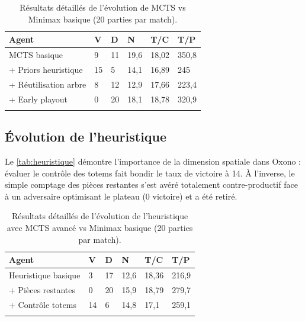 \documentclass[a4paper,11pt]{article}
\begin{document}
\begin{table}[H]
	\centering
	\caption{Résultats détaillés de l'évolution de MCTS vs Minimax basique (20 parties par match).}
	\label{tab:mcts}
	\begin{tabularx}{\textwidth}{lXXXXX}
		\toprule
		\textbf{Agent}        & \textbf{V} & \textbf{D} & \textbf{N} & \textbf{T/C} & \textbf{T/P} \\
		\midrule
		MCTS basique          & 9          & 11         & 19,6       & 18,02        & 350,8        \\
		+ Priors heuristique  & 15         & 5          & 14,1       & 16,89        & 245          \\
		+ Réutilisation arbre & 8          & 12         & 12,9       & 17,66        & 223,4        \\
		+ Early playout       & 0          & 20         & 18,1       & 18,78        & 320,9        \\
		\bottomrule
		\addlinespace
	\end{tabularx}
\end{table}

\subsection{Évolution de l'heuristique}

Le \autoref{tab:heuristique} démontre l'importance de la dimension spatiale dans Oxono : évaluer le contrôle des totems fait bondir le taux de victoire à 14. À l'inverse, le simple comptage des pièces restantes s'est avéré totalement contre-productif face à un adversaire optimisant le plateau (0 victoire) et a été retiré.

\begin{table}[H]
	\centering
	\caption{Résultats détaillés de l'évolution de l'heuristique avec MCTS avancé vs Minimax basique  (20 parties par match).}
	\label{tab:heuristique}
	\begin{tabularx}{\textwidth}{lXXXXX}
		\toprule
		\textbf{Agent}      & \textbf{V} & \textbf{D} & \textbf{N} & \textbf{T/C} & \textbf{T/P} \\
		\midrule
		Heuristique basique & 3          & 17         & 12,6       & 18,36        & 216,9        \\
		+ Pièces restantes  & 0          & 20         & 15,9       & 18,79        & 279,7        \\
		+ Contrôle totems   & 14         & 6          & 14,8       & 17,1         & 259,1        \\
		\bottomrule
		\addlinespace
	\end{tabularx}
\end{table}
\end{document}
